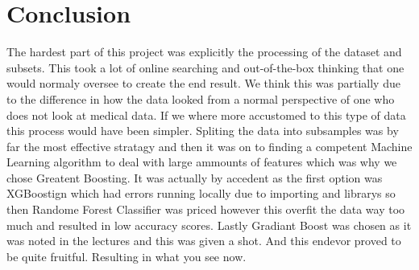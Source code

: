 \documentclass{article}
\begin{document}
\section{Conclusion}

The hardest part of this project was explicitly the processing of the dataset and subsets. This took a lot of online searching and out-of-the-box thinking that one would normaly oversee to create the end result. We think this was partially due to the difference in how the data looked from a normal perspective of one who does not look at medical data. If we where more accustomed to this type of data this process would have been simpler. Spliting the data into subsamples was by far the most effective stratagy and then it was on to finding a competent Machine Learning algorithm to deal with large ammounts of features which was why we chose Greatent Boosting. It was actually by accedent as the first option was XGBoostign which had errors running locally due to importing and librarys so then Randome Forest Classifier was priced however this overfit the data way too much and resulted in low accuracy scores. Lastly Gradiant Boost was chosen as it was noted in the lectures and this was given a shot. And this endevor proved to be quite fruitful. Resulting in what you see now. 
\end{document}
